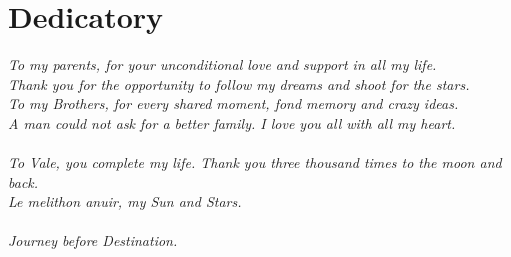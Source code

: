 \section*{Dedicatory}
\textit{To my parents, for your unconditional love and support in all my life.
\\Thank you for the opportunity to follow my dreams and shoot for the stars.
\\To my Brothers, for every shared moment, fond memory and crazy ideas.
\\A man could not ask for a better family. I love you all with all my heart.
\\
\\
To Vale, you complete my life. Thank you three thousand times to the moon and back.
\\Le melithon anuir, my Sun and Stars.
\\
\\Journey before Destination.
}


